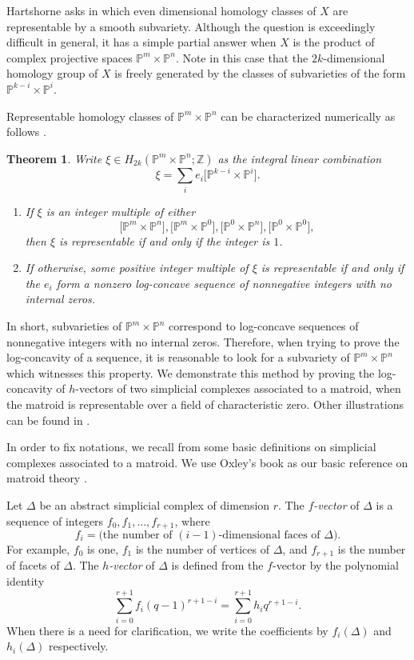 \documentclass{compositio}
\newtheorem{theorem}{Theorem}
\theoremstyle{definition}
\theoremstyle{remark}
\begin{document}
Hartshorne asks in \cite[Question 1.3]{HartshorneSurvey} 
which even dimensional homology classes of $X$ are representable by a smooth subvariety. Although the question is exceedingly difficult in general, it has a simple partial answer when $X$ is the product of complex projective spaces  $\mathbb{P}^m \times \mathbb{P}^n$. Note in this case that the $2k$-dimensional homology group of $X$ is freely generated by the classes of subvarieties of the form $\mathbb{P}^{k-i} \times \mathbb{P}^{i}$. 


Representable homology classes of $\mathbb{P}^m \times \mathbb{P}^n$ can be characterized numerically as follows \cite[Theorem 20]{Huh}.


\begin{theorem}\label{LC}
Write $\xi \in H_{2k}(\mathbb{P}^m \times \mathbb{P}^n;\mathbb{Z})$ as the integral linear combination
\[
\xi =\sum_{i} e_i \big[\mathbb{P}^{k-i} \times \mathbb{P}^{i}\big].
\]
\begin{enumerate}
\item If $\xi$ is an integer multiple of either
\[
\big[\mathbb{P}^m \times \mathbb{P}^n\big], \big[\mathbb{P}^m \times \mathbb{P}^0\big], \big[\mathbb{P}^0 \times \mathbb{P}^n\big], \big[\mathbb{P}^0 \times \mathbb{P}^0\big],
\]
then $\xi$ is representable if and only if the integer is $1$.
\item If otherwise, some positive integer multiple of $\xi$ is representable if and only if the $e_i$ form a nonzero log-concave sequence of
nonnegative integers with no internal zeros.
\end{enumerate}
\end{theorem}

In short, subvarieties of $\mathbb{P}^m \times \mathbb{P}^n$ correspond to log-concave sequences of nonnegative integers with no internal zeros. Therefore, when trying to prove the log-concavity of a sequence, it is reasonable to look for a subvariety of $\mathbb{P}^m \times \mathbb{P}^n$ which witnesses this property. We demonstrate this method by proving the log-concavity of $h$-vectors of two simplicial complexes associated to a matroid, when the matroid is representable over a field of characteristic zero. Other illustrations can be found in \cite{Huh,Huh-Katz,Lenz}.

In order to fix notations, we recall from \cite{Bjorner3} some basic definitions on simplicial complexes associated to a matroid. We use Oxley's book as our basic reference on matroid theory \cite{Oxley}. 

Let $\Delta$ be an abstract simplicial complex of dimension $r$. The \emph{$f$-vector} of $\Delta$ is a sequence of integers $f_0,f_1,\ldots,f_{r+1}$, where
\[
f_i = \big(\text{the number of $(i-1)$-dimensional faces of $\Delta$}\big).
\]
For example, $f_0$ is one, $f_1$ is the number of vertices of $\Delta$, and $f_{r+1}$ is the number of facets of $\Delta$. The \emph{$h$-vector} of $\Delta$ is defined from the $f$-vector by the polynomial identity
\[
\sum_{i=0}^{r+1} f_i (q-1)^{r+1-i}= \sum_{i=0}^{r+1} h_i q^{r+1-i}.
\]
When there is a need for clarification, we write the coefficients by $f_i(\Delta)$ and $h_i(\Delta)$ respectively.
\end{document}
